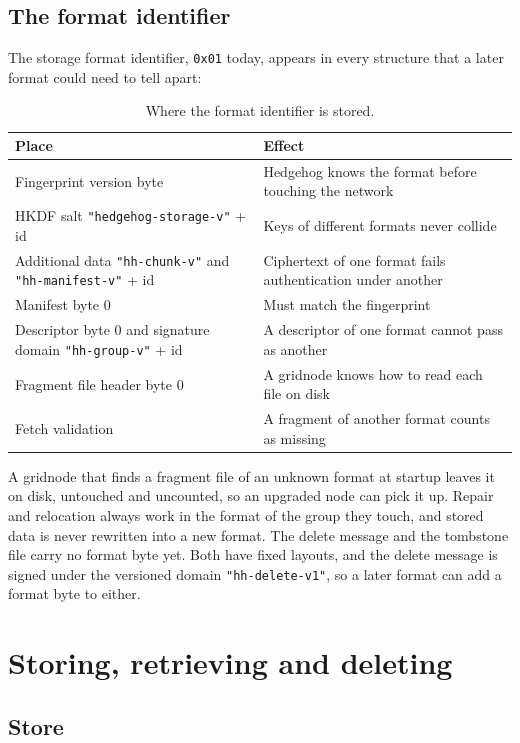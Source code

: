 \documentclass[10pt,a4paper,final]{article}
\newcommand{\code}[1]{\texttt{#1}}
\begin{document}
\subsection{The format identifier}

The storage format identifier, \code{0x01} today, appears in every structure that a later format could need to tell
apart:

\begin{table}[H]
\centering
\small
\begin{tabularx}{\linewidth}{@{}p{5.6cm}L@{}}
\toprule
Place & Effect \\
\midrule
Fingerprint version byte & Hedgehog knows the format before touching the network \\
HKDF salt \code{"hedgehog-storage-v"} + id & Keys of different formats never collide \\
Additional data \code{"hh-chunk-v"} and \code{"hh-manifest-v"} + id & Ciphertext of one format fails authentication
under another \\
Manifest byte 0 & Must match the fingerprint \\
Descriptor byte 0 and signature domain \code{"hh-group-v"} + id & A descriptor of one format cannot pass as
another \\
Fragment file header byte 0 & A gridnode knows how to read each file on disk \\
Fetch validation & A fragment of another format counts as missing \\
\bottomrule
\end{tabularx}
\caption{Where the format identifier is stored.}
\end{table}

A gridnode that finds a fragment file of an unknown format at startup leaves it on disk, untouched and uncounted, so
an upgraded node can pick it up. Repair and relocation always work in the format of the group they touch, and stored
data is never rewritten into a new format. The delete message and the tombstone file carry no format byte yet. Both
have fixed layouts, and the delete message is signed under the versioned domain \code{"hh-delete-v1"}, so a later
format can add a format byte to either.

\section{Storing, retrieving and deleting}
\label{sec:operations}

\subsection{Store}
\end{document}
